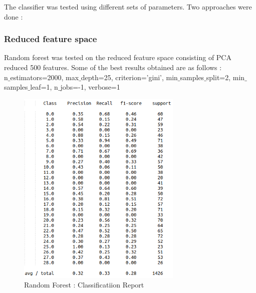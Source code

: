 \documentclass[12pt]{report}
\begin{document}
The classifier was tested using different sets of parameters. Two approaches were done :

\subsubsection{Reduced feature space}
Random forest was tested on the reduced feature space consisting of PCA reduced 500 features. Some of the best results obtained are as follows :\\


n$\_$estimators=2000, max$\_$depth=25, criterion='gini', min$\_$samples$\_$split=2, min$\_$samples$\_$leaf=1, n$\_$jobs=-1, verbose=1

\begin{figure}[H]
  \centering
  \includegraphics[width=0.7\textwidth]{Images/rf1.png}
  \caption{Random Forest : Classificatiion Report}
\end{figure}
\end{document}
